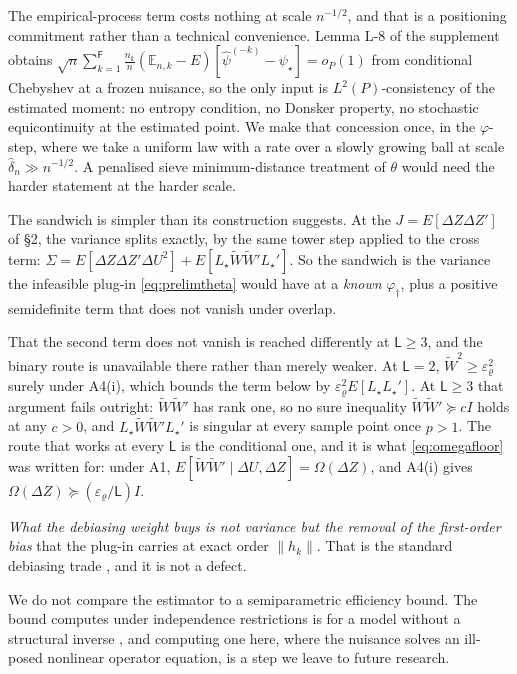 \documentclass[
  12pt]{article}
\newcommand{\1}[1]{\mathds{1}\left[#1\right]}
\theoremstyle{plain}
\theoremstyle{definition}
\theoremstyle{definition}
\theoremstyle{remark}
\newcommand{\vdagger}{\varphi_{\dagger}}
\begin{document}
The empirical-process term costs nothing at scale \(n^{-1/2}\), and that
is a positioning commitment rather than a technical convenience. Lemma
L-8 of the supplement obtains
\(\sqrt n\sum_{k=1}^{\mathsf F}\tfrac{n_k}{n}(\mathbb E_{n,k}-E)[\hat\psi^{(-k)}-\psi_\star]=o_P(1)\)
from conditional Chebyshev at a frozen nuisance, so the only input is
\(L^{2}(P)\)-consistency of the estimated moment: no entropy condition,
no Donsker property, no stochastic equicontinuity at the estimated
point. We make that concession once, in the \(\varphi\)-step, where we
take a uniform law with a rate over a slowly growing ball at scale
\(\hat\delta_n\gg n^{-1/2}\). A penalised sieve minimum-distance
treatment of \(\theta\) would need the harder statement at the harder
scale.

The sandwich is simpler than its construction suggests. At the
\(J=E[\Delta Z\Delta Z']\) of \S2, the variance splits exactly, by the
same tower step applied to the cross term:
\(\Sigma=E[\Delta Z\Delta Z'\Delta U^{2}]+E[L_\star\widetilde W\widetilde W'L_\star']\).
So the sandwich is the variance the infeasible plug-in
\eqref{eq:prelimtheta} would have at a \emph{known} \(\vdagger\), plus a
positive semidefinite term that does not vanish under overlap.

That the second term does not vanish is reached differently at
\(\mathsf L\ge3\), and the binary route is unavailable there rather than
merely weaker. At \(\mathsf L=2\),
\(\widetilde W^{2}\ge\varepsilon_\varrho^{2}\) surely under A4(i), which
bounds the term below by \(\varepsilon_\varrho^{2}E[L_\star L_\star']\).
At \(\mathsf L\ge3\) that argument fails outright:
\(\widetilde W\widetilde W'\) has rank one, so no sure inequality
\(\widetilde W\widetilde W'\succeq cI\) holds at any \(c>0\), and
\(L_\star\widetilde W\widetilde W'L_\star'\) is singular at every sample
point once \(p>1\). The route that works at every \(\mathsf L\) is the
conditional one, and it is what \eqref{eq:omegafloor} was written for:
under A1,
\(E[\widetilde W\widetilde W'\mid\Delta U,\Delta Z]=\Omega(\Delta Z)\),
and A4(i) gives
\(\Omega(\Delta Z)\succeq(\varepsilon_\varrho/\mathsf L)I\).

\emph{What the debiasing weight buys is not variance but the removal of
the first-order bias} that the plug-in carries at exact order
\(\|h_k\|\). That is the standard debiasing trade
\citep[see][]{chernozhukov2022lr,ichimuranewey2022}, and it is not a
defect.

We do not compare the estimator to a semiparametric efficiency bound.
The bound \citet{poirier2017} computes under independence restrictions
is for a model without a structural inverse
\citep[see also][]{aichen2012,bkrw1993}, and computing one here, where
the nuisance solves an ill-posed nonlinear operator equation, is a step
we leave to future research.
\end{document}
